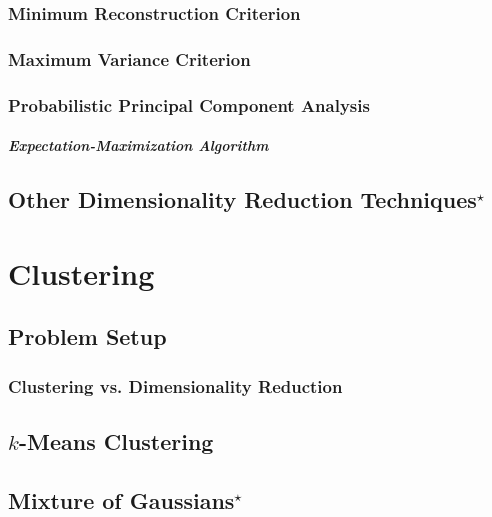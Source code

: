 \documentclass{report}
\begin{document}
\subsection{Minimum Reconstruction Criterion}

\subsection{Maximum Variance Criterion}


\subsection{Probabilistic Principal Component Analysis}

\paragraph{Expectation-Maximization Algorithm}

\section{Other Dimensionality Reduction Techniques$^\star$}


\chapter{Clustering}
\label{sec:cluster}

\section{Problem Setup}

\subsection{Clustering vs. Dimensionality Reduction}

\section{$k$-Means Clustering}

\section{Mixture of Gaussians$^\star$}
\end{document}
